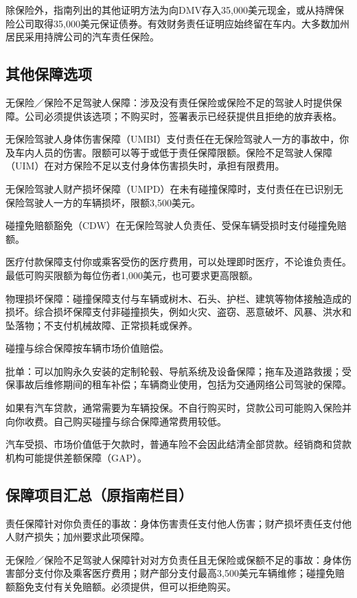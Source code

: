 \documentclass[UTF8,fontset=none,11pt,a4paper]{ctexart}
\begin{document}
除保险外，指南列出的其他证明方法为向DMV存入35,000美元现金，或从持牌保险公司取得35,000美元保证债券。有效财务责任证明应始终留在车内。大多数加州居民采用持牌公司的汽车责任保险。


\subsection*{其他保障选项}
无保险／保险不足驾驶人保障：涉及没有责任保险或保险不足的驾驶人时提供保障。公司必须提供该选项；不购买时，签署表示已经获提供且拒绝的放弃表格。


无保险驾驶人身体伤害保障（UMBI）支付责任在无保险驾驶人一方的事故中，你及车内人员的伤害。限额可以等于或低于责任保障限额。保险不足驾驶人保障（UIM）在对方保险不足以支付身体伤害损失时，承担有限费用。


无保险驾驶人财产损坏保障（UMPD）在未有碰撞保障时，支付责任在已识别无保险驾驶人一方的车辆损坏，限额3,500美元。


碰撞免赔额豁免（CDW）在无保险驾驶人负责任、受保车辆受损时支付碰撞免赔额。


医疗付款保障支付你或乘客受伤的医疗费用，可以处理即时医疗，不论谁负责任。最低可购买限额为每位伤者1,000美元，也可要求更高限额。


物理损坏保障：碰撞保障支付与车辆或树木、石头、护栏、建筑等物体接触造成的损坏。综合损坏保障支付非碰撞损失，例如火灾、盗窃、恶意破坏、风暴、洪水和坠落物；不支付机械故障、正常损耗或保养。


碰撞与综合保障按车辆市场价值赔偿。


批单：可以加购永久安装的定制轮毂、导航系统及设备保障；拖车及道路救援；受保事故后维修期间的租车补偿；车辆商业使用，包括为交通网络公司驾驶的保障。


如果有汽车贷款，通常需要为车辆投保。不自行购买时，贷款公司可能购入保险并向你收费。自己购买碰撞与综合保障通常费用较低。


汽车受损、市场价值低于欠款时，普通车险不会因此结清全部贷款。经销商和贷款机构可能提供差额保障（GAP）。


\subsection*{保障项目汇总（原指南栏目）}
责任保障针对你负责任的事故：身体伤害责任支付他人伤害；财产损坏责任支付他人财产损失；加州要求此项保障。


无保险／保险不足驾驶人保障针对对方负责任且无保险或保额不足的事故：身体伤害部分支付你及乘客医疗费用；财产部分支付最高3,500美元车辆维修；碰撞免赔额豁免支付有关免赔额。必须提供，但可以拒绝购买。
\end{document}
